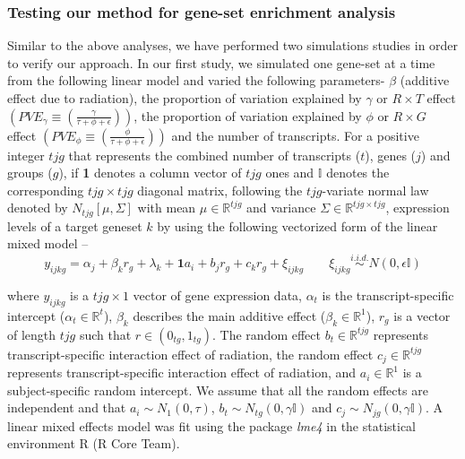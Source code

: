 \documentclass[hidelinks,11pt]{article}
\begin{document}
\subsubsection*{Testing our method for gene-set enrichment analysis}

Similar to the above analyses, we have performed two simulations studies in order to verify our approach. In our first study, we simulated one gene-set at a time from the following linear model and varied the following parameters- $\beta$ (additive effect due to radiation), the proportion of variation explained by $\gamma$ or $R \times T$ effect $\left( PVE_{\gamma} \equiv \left(\frac{\gamma}{\tau + \phi + \epsilon}\right) \right)$, the proportion of variation explained by $\phi$ or $R \times G$ effect  $\left( PVE_{\phi} \equiv \left(\frac{\phi}{\tau + \phi + \epsilon}\right) \right)$ and the number of transcripts. For a positive integer $tjg$ that represents the combined number of transcripts ($t$), genes ($j$) and groups ($g$), if \textbf{1} denotes a column vector of $tjg$ ones and $\mathbb{I}$ denotes the corresponding $tjg \times tjg$ diagonal matrix, following the $tjg$-variate normal law denoted by $N_{tjg}\left[\mu,\Sigma\right]$ with mean $\mu \in \mathbb{R}^{tjg}$ and variance $\Sigma \in \mathbb{R}^{tjg \times tjg}$, expression levels of a target geneset $k$ by using the following vectorized form of the linear mixed model --
\begin{equation}
y_{ijkg} = \alpha_{j} + \beta_{k} r_{g} + \lambda_{k} + \textbf{1} a_i + b_{j} r_{g} +  c_{k} r_{g} + \xi_{ijkg} \qquad \xi_{ijkg}  \overset{i.i.d.} \sim N \left( 0, \epsilon\mathbb{I} \right)
\end{equation}

where $y_{ijkg}$ is a $tjg \times 1$ vector of gene expression data, $\alpha_t$ is the transcript-specific intercept ($\alpha_t \in \mathbb{R}^t$), $\beta_k$ describes the main additive effect ($\beta_k \in \mathbb{R}^1$), $r_g$ is a vector of length $tjg$ such that $r \in \left(0_{tg},1_{tg}\right)$. The random effect $b_t \in \mathbb{R}^{tjg}$ represents transcript-specific interaction effect of radiation, the random effect $c_j \in \mathbb{R}^{tjg}$ represents transcript-specific interaction effect of radiation, and $a_i \in \mathbb{R}^1$ is a subject-specific random intercept. We assume that all the random effects are independent and that $a_i \sim N_1 \left(0, \tau \right)$, $b_t \sim N_{tg} \left(0, \gamma\mathbb{I} \right)$ and $c_j \sim N_{jg} \left(0, \gamma\mathbb{I} \right)$. A linear mixed effects model was fit using the package \emph{lme4}\cite{lme4} in the statistical environment R (R Core Team). 
\end{document}
